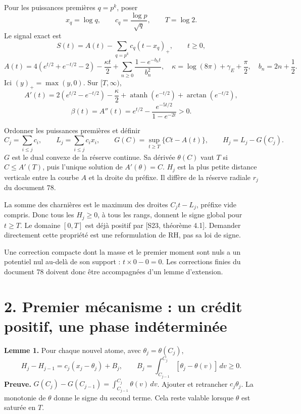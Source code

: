 \documentclass[
  11pt,
  a4paper,
]{article}
\begin{document}
Pour les puissances premières \(q=p^k\), poser \[
x_q=\log q,\qquad c_q=\frac{\log p}{\sqrt q},\qquad T=\log2.
\] Le signal exact est \[
S(t)=A(t)-\sum_{q=p^k}c_q(t-x_q)_+,\qquad t\ge0,
\] \[
A(t)=4(e^{t/2}+e^{-t/2}-2)-\frac{\kappa t}{2}
 +\sum_{n\ge0}\frac{1-e^{-b_nt}}{b_n^2},
\quad \kappa=\log(8\pi)+\gamma_E+\frac\pi2,\quad b_n=2n+\frac12.
\] Ici \((y)_+=\max(y,0)\). Sur \([T,\infty)\), \[
A'(t)=2(e^{t/2}-e^{-t/2})-\frac\kappa2
       +\operatorname{atanh}(e^{-t/2})+\arctan(e^{-t/2}),
\] \[
\beta(t)=A''(t)=e^{t/2}-\frac{e^{-5t/2}}{1-e^{-2t}}>0.
\]

Ordonner les puissances premières et définir \[
C_j=\sum_{i\le j}c_i,\qquad L_j=\sum_{i\le j}c_ix_i,
\qquad G(C)=\sup_{t\ge T}\{Ct-A(t)\},\qquad H_j=L_j-G(C_j).
\] \(G\) est le dual convexe de la réserve continue. Sa dérivée
\(\theta(C)\) vaut \(T\) si \(C\le A'(T)\), puis l'unique solution de
\(A'(\theta)=C\). \(H_j\) est la plus petite distance verticale entre la
courbe \(A\) et la droite du préfixe. Il diffère de la réserve radiale
\(r_j\) du document 78.

La somme des charnières est le maximum des droites \(C_jt-L_j\), préfixe
vide compris. Donc tous les \(H_j\ge0\), à tous les rangs, donnent le
signe global pour \(t\ge T\). Le domaine \([0,T]\) est déjà positif par
{[}S23, théorème 4.1{]}. Demander directement cette propriété est une
reformulation de RH, pas sa loi de signe.

Une correction compacte dont la masse et le premier moment sont nuls a
un potentiel nul au-delà de son support : \(t\times0-0=0\). Les
corrections finies du document 78 doivent donc être accompagnées d'un
lemme d'extension.

\newpage

\hypertarget{premier-muxe9canisme-un-cruxe9dit-positif-une-phase-induxe9terminuxe9e}{%
\section{2. Premier mécanisme : un crédit positif, une phase
indéterminée}\label{premier-muxe9canisme-un-cruxe9dit-positif-une-phase-induxe9terminuxe9e}}

\textbf{Lemme 1.} Pour chaque nouvel atome, avec
\(\theta_j=\theta(C_j)\), \[
H_j-H_{j-1}=c_j(x_j-\theta_j)+B_j,
\qquad B_j=\int_{C_{j-1}}^{C_j}[\theta_j-\theta(v)]\,dv\ge0.
\] \textbf{Preuve.}
\(G(C_j)-G(C_{j-1})=\int_{C_{j-1}}^{C_j}\theta(v)\,dv\). Ajouter et
retrancher \(c_j\theta_j\). La monotonie de \(\theta\) donne le signe du
second terme. Cela reste valable lorsque \(\theta\) est saturée en
\(T\).
\end{document}
